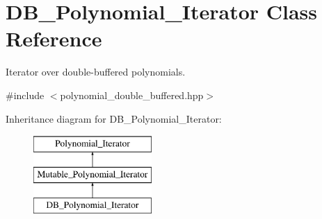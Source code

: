 \hypertarget{class_d_b___polynomial___iterator}{}\section{D\+B\+\_\+\+Polynomial\+\_\+\+Iterator Class Reference}
\label{class_d_b___polynomial___iterator}


Iterator over double-\/buffered polynomials.  




{\ttfamily \#include $<$polynomial\+\_\+double\+\_\+buffered.\+hpp$>$}

Inheritance diagram for D\+B\+\_\+\+Polynomial\+\_\+\+Iterator\+:\begin{figure}[H]
\begin{center}
\leavevmode
\includegraphics[height=3.000000cm]{class_d_b___polynomial___iterator}
\end{center}
\end{figure}
